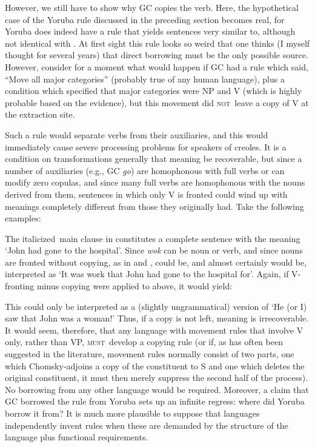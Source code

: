 However, we still have to show why GC copies the verb. Here, the hypothetical case of the Yoruba rule discussed in the preceding section becomes real, for Yoruba does indeed have a rule that yields sentences very similar to, although not identical with . At first sight this rule looks so weird that one thinks (I myself thought for several years) that direct borrowing must be the only possible source. However, consider for a moment what would happen if GC had a rule which said, ``Move all major categories'' (probably true of any human lan\-guage), plus a condition which specified that major categories were NP and V (which is highly probable based on the evidence), but this movement did \textsc{not}~leave a copy of V at the extraction site.

Such a rule would separate verbs from their auxiliaries, and this would immediately cause severe processing problems for speakers of creoles. It is a condition on transformations generally that meaning be recoverable, but since a number of auxiliaries (e.g., GC \textit{go}) are homoph\-onous with full verbs or can modify zero copulas, and since many full verbs are homophonous with the nouns derived from them, sentences in which only V is fronted could wind up with meanings completely different from those they originally had. Take the following examples:


\z

\label{ex:2:11}\z
The italicized~main clause in  constitutes a complete sentence with the meaning `John had gone to the hospital'. Since \textit{wok} can be noun or verb, and since nouns are fronted without copying, as in  and ,  could be, and almost certainly would be, interpreted as `It was work that John had gone to the hospital for'. Again, if V-fronting minus copying were applied to  above, it would yield:

\label{ex:2:12}\z
This could only be interpreted as a (slightly ungrammatical) version of `He (or I) saw that John was a woman!' Thus, if a copy is not left, meaning is irrecoverable. It would seem, therefore, that any language with movement rules that involve V only, rather than VP, \textsc{must}~de\-velop a copying rule (or if, as has often been suggested in the literature, movement rules normally consist of two parts, one which Chomsky-adjoins a copy of the constituent to S and one which deletes the original constituent, it must then merely suppress the second half of the process). No borrowing from any other language would be required. Moreover, a claim that GC borrowed the rule from Yoruba sets up an infinite regress: where did Yoruba borrow it from? It is much more plausible to suppose that languages independently invent rules when these are demanded by the structure of the language plus func\-tional requirements.


